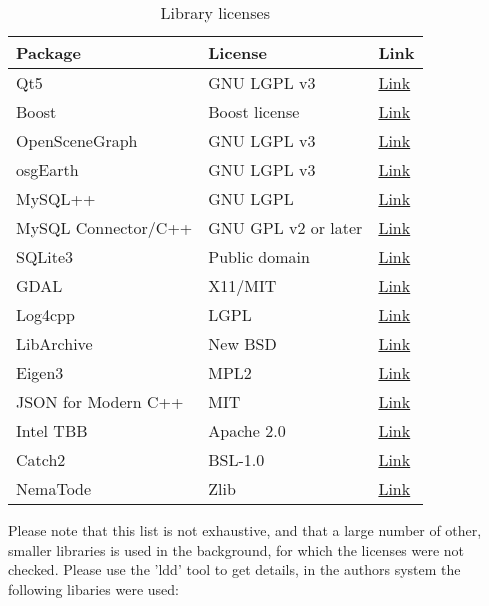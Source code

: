 \begin{table}[H]
  \center
  \begin{tabular}{ | l | l | l |}
    \hline
    \textbf{Package} & \textbf{License} & \textbf{Link} \\ \hline
    Qt5 & GNU LGPL v3 &\href{https://doc.qt.io/qt-5.10/licensing.html}{Link} \\ \hline
    Boost & Boost license  & \href{https://www.boost.org/users/license.html}{Link} \\ \hline
    OpenSceneGraph & GNU LGPL v3 &\href{http://www.openscenegraph.org/index.php/about/licensing}{Link} \\ \hline
    osgEarth & GNU LGPL v3 &\href{hhttps://github.com/gwaldron/osgearth/blob/master/LICENSE.txt}{Link} \\ \hline    
    MySQL++ & GNU LGPL & \href{https://tangentsoft.com/mysqlpp/wiki?name=FAQ}{Link} \\ \hline
    MySQL Connector/C++ & GNU GPL v2 or later & \href{https://downloads.mysql.com/docs/licenses/connector-cpp-gpl-en.pdf}{Link} \\ \hline
    SQLite3 & Public domain & \href{https://www.sqlite.org/copyright.html}{Link} \\ \hline
    GDAL & X11/MIT & \href{https://trac.osgeo.org/gdal/wiki/FAQGeneral#WhatlicensedoesGDALOGRuse}{Link} \\ \hline
    Log4cpp & LGPL & \href{http://log4cpp.sourceforge.net/#license}{Link} \\ \hline
    LibArchive & New BSD & \href{https://raw.githubusercontent.com/libarchive/libarchive/master/COPYING}{Link} \\ \hline
    Eigen3 & MPL2 & \href{http://eigen.tuxfamily.org/index.php?title=Main_Page}{Link} \\ \hline
    JSON for Modern C++ & MIT & \href{https://github.com/nlohmann/json}{Link} \\ \hline
    Intel TBB & Apache 2.0 & \href{https://www.threadingbuildingblocks.org/}{Link} \\ \hline
    Catch2 & BSL-1.0 & \href{https://github.com/catchorg/Catch2}{Link} \\ \hline
    NemaTode & Zlib & \href{https://github.com/ckgt/NemaTode}{Link} \\ \hline
  \end{tabular}
  \caption{Library licenses}
\end{table}

Please note that this list is not exhaustive, and that a large number of other, smaller libraries is used in the background, for which the licenses were not checked. Please use the 'ldd' tool to get details, in the authors system the following libaries were used:

